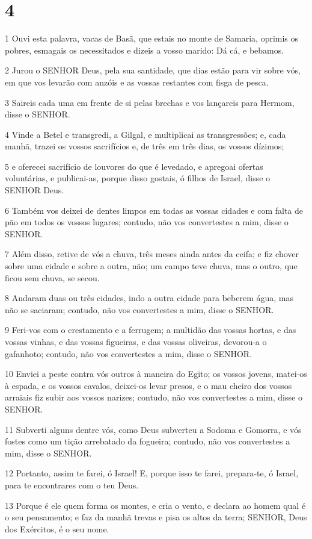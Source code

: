 \chapter{4}

\par 1 Ouvi esta palavra, vacas de Basã, que estais no monte de Samaria, oprimis os pobres, esmagais os necessitados e dizeis a vosso marido: Dá cá, e bebamos.
\par 2 Jurou o SENHOR Deus, pela sua santidade, que dias estão para vir sobre vós, em que vos levarão com anzóis e as vossas restantes com fisga de pesca.
\par 3 Saireis cada uma em frente de si pelas brechas e vos lançareis para Hermom, disse o SENHOR.
\par 4 Vinde a Betel e transgredi, a Gilgal, e multiplicai as transgressões; e, cada manhã, trazei os vossos sacrifícios e, de três em três dias, os vossos dízimos;
\par 5 e oferecei sacrifício de louvores do que é levedado, e apregoai ofertas voluntárias, e publicai-as, porque disso gostais, ó filhos de Israel, disse o SENHOR Deus.
\par 6 Também vos deixei de dentes limpos em todas as vossas cidades e com falta de pão em todos os vossos lugares; contudo, não vos convertestes a mim, disse o SENHOR.
\par 7 Além disso, retive de vós a chuva, três meses ainda antes da ceifa; e fiz chover sobre uma cidade e sobre a outra, não; um campo teve chuva, mas o outro, que ficou sem chuva, se secou.
\par 8 Andaram duas ou três cidades, indo a outra cidade para beberem água, mas não se saciaram; contudo, não vos convertestes a mim, disse o SENHOR.
\par 9 Feri-vos com o crestamento e a ferrugem; a multidão das vossas hortas, e das vossas vinhas, e das vossas figueiras, e das vossas oliveiras, devorou-a o gafanhoto; contudo, não vos convertestes a mim, disse o SENHOR.
\par 10 Enviei a peste contra vós outros à maneira do Egito; os vossos jovens, matei-os à espada, e os vossos cavalos, deixei-os levar presos, e o mau cheiro dos vossos arraiais fiz subir aos vossos narizes; contudo, não vos convertestes a mim, disse o SENHOR.
\par 11 Subverti alguns dentre vós, como Deus subverteu a Sodoma e Gomorra, e vós fostes como um tição arrebatado da fogueira; contudo, não vos convertestes a mim, disse o SENHOR.
\par 12 Portanto, assim te farei, ó Israel! E, porque isso te farei, prepara-te, ó Israel, para te encontrares com o teu Deus.
\par 13 Porque é ele quem forma os montes, e cria o vento, e declara ao homem qual é o seu pensamento; e faz da manhã trevas e pisa os altos da terra; SENHOR, Deus dos Exércitos, é o seu nome.

